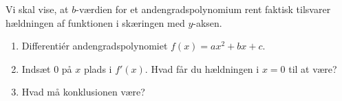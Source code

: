 Vi skal vise, at $b$-værdien for et andengradspolynomium rent faktisk tilsvarer hældningen af funktionen i skæringen med $y$-aksen. 

\begin{enumerate}[label=\roman*)]
	\item Differentiér andengradspolynomiet $f(x) = ax^2+bx+c$. 
	\item Indsæt $0$ på $x$ plads i $f'(x)$. Hvad får du hældningen i $x = 0$ til at være?
	\item Hvad må konklusionen være?
\end{enumerate}


